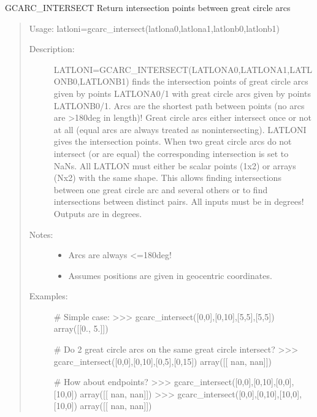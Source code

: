\documentclass[letterpaper,10pt,english]{sphinxmanual}
\begin{document}
\begin{fulllineitems}
\label{\detokenize{infrapy.utils:infrapy.utils.latlon.gcarc_intersect}}
GCARC\_INTERSECT    Return intersection points between great circle arcs
\begin{quote}

Usage:    latloni=gcarc\_intersect(latlona0,latlona1,latlonb0,latlonb1)
\begin{description}
\item[{Description:}] \leavevmode
LATLONI=GCARC\_INTERSECT(LATLONA0,LATLONA1,LATLONB0,LATLONB1) finds the
intersection points of great circle arcs given by points LATLONA0/1
with great circle arcs given by points LATLONB0/1.  Arcs are the
shortest path between points (no arcs are \textgreater{}180deg in length)!  Great
circle arcs either intersect once or not at all (equal arcs are always
treated as non\sphinxhyphen{}intersecting).  LATLONI gives the intersection points.
When two great circle arcs do not intersect (or are equal) the
corresponding intersection is set to NaNs.  All LATLON must either be
scalar points (1x2) or arrays (Nx2) with the same shape.  This allows
finding intersections between one great circle arc and several others
or to find intersections between distinct pairs.  All inputs must be in
degrees! Outputs are in degrees.

\item[{Notes:}] \leavevmode\begin{itemize}
\item {} 
Arcs are always \textless{}=180deg!

\item {} 
Assumes positions are given in geocentric coordinates.

\end{itemize}

\item[{Examples:}] \leavevmode
\# Simple case:
\textgreater{}\textgreater{}\textgreater{} gcarc\_intersect({[}0,0{]},{[}0,10{]},{[}\sphinxhyphen{}5,5{]},{[}5,5{]})
array({[}{[}\sphinxhyphen{}0.,  5.{]}{]})

\# Do 2 great circle arcs on the same great circle intersect?
\textgreater{}\textgreater{}\textgreater{} gcarc\_intersect({[}0,0{]},{[}0,10{]},{[}0,5{]},{[}0,15{]})
array({[}{[} nan,  nan{]}{]})

\# How about endpoints?
\textgreater{}\textgreater{}\textgreater{} gcarc\_intersect({[}0,0{]},{[}0,10{]},{[}0,0{]},{[}10,0{]})
array({[}{[} nan,  nan{]}{]})
\textgreater{}\textgreater{}\textgreater{} gcarc\_intersect({[}0,0{]},{[}0,10{]},{[}\sphinxhyphen{}10,0{]},{[}10,0{]})
array({[}{[} nan,  nan{]}{]})


\end{description}
\end{quote}
\end{fulllineitems}
\end{document}
